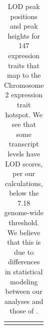 \documentclass[oneside]{book}\usepackage[]{graphicx}\usepackage[]{color}
\begin{document}
\begin{appendices}
{\small
\begin{longtable}{lrr}
\caption{LOD peak positions and peak heights for 147 expression traits that map to the Chromosome 2 expression trait hotspot. We see that some transcript levels have LOD scores, per our calculations, below the 7.18 genome-wide threshold. We believe that this is due to differences in statistical modeling between our analyses and those of \citet{keller2018genetic}.}\label{tab:chr2-hot}\\ 
\hline \\


\end{longtable}}
\end{appendices}
\end{document}
